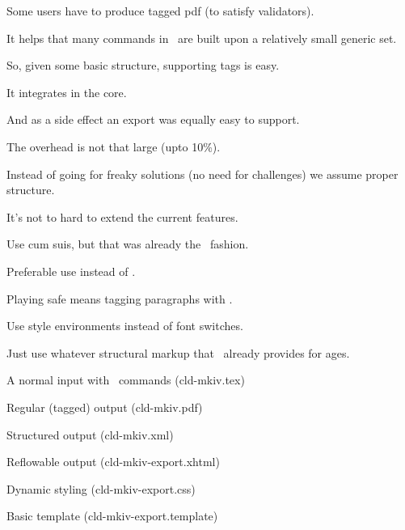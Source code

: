 
\StartSteps
\startitemize
\item Some users have to produce tagged pdf (to satisfy validators). \FlushStep
\item It helps that many commands in \CONTEXT\ are built upon a relatively small generic set. \FlushStep
\item So, given some basic structure, supporting tags is easy. \FlushStep
\item It integrates in the core. \FlushStep
\item And as a side effect an export was equally easy to support. \FlushStep
\item The overhead is not that large (upto 10\%). \FlushStep
\item Instead of going for freaky solutions (no need for challenges) we assume proper structure. \FlushStep
\item It's not to hard to extend the current features. \FlushStep
\stopitemize
\StopSteps


\StartSteps
\startitemize
\item Use \type{\startchapter} cum suis, but that was already the \MKIV\ fashion. \FlushStep
\item Preferable use \type{\startitem} instead of \type {\item}. \FlushStep
\item Playing safe means tagging paragraphs with \type {\startparagraph}. \FlushStep
\item Use style environments instead of font switches. \FlushStep
\item Just use whatever structural markup that \CONTEXT\ already provides for ages. \FlushStep
\stopitemize
\StopSteps


\StartSteps
\startitemize
\item A normal input with \TEX\ commands (cld-mkiv.tex) \FlushStep
\item Regular (tagged) output (cld-mkiv.pdf) \FlushStep
\item Structured output (cld-mkiv.xml) \FlushStep
\item Reflowable output (cld-mkiv-export.xhtml) \FlushStep
\item Dynamic styling (cld-mkiv-export.css) \FlushStep
\item Basic template (cld-mkiv-export.template) \FlushStep
\stopitemize
\StopSteps

\stopdocument
